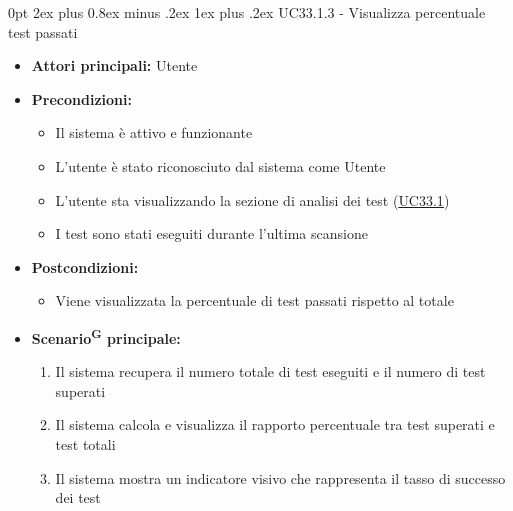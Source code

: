 \documentclass[a4paper, 11pt]{article}
\makeatletter
\renewcommand\subparagraph{\@startsection{subparagraph}{5}
  {0pt}
  {2ex plus 0.8ex minus .2ex}
  {1ex plus .2ex}
  {\normalfont\normalsize\bfseries\color{AccentColor}}}
\makeatother
\begin{document}
\subparagraph{UC33.1.3 - Visualizza percentuale test passati}\label{UC33.1.3}
\begin{itemize}
    \item \textbf{Attori principali:} Utente
    \item \textbf{Precondizioni:}
    \begin{itemize}
        \item Il sistema è attivo e funzionante
        \item L'utente è stato riconosciuto dal sistema come Utente
        \item L'utente sta visualizzando la sezione di analisi dei test (\hyperref[UC33.1]{UC33.1})
        \item I test sono stati eseguiti durante l'ultima scansione
    \end{itemize}
    \item \textbf{Postcondizioni:}
    \begin{itemize}
        \item Viene visualizzata la percentuale di test passati rispetto al totale
    \end{itemize}
    \item \textbf{Scenario\textsuperscript{G} principale:}
    \begin{enumerate}
        \item Il sistema recupera il numero totale di test eseguiti e il numero di test superati
        \item Il sistema calcola e visualizza il rapporto percentuale tra test superati e test totali
        \item Il sistema mostra un indicatore visivo che rappresenta il tasso di successo dei test
    \end{enumerate}
\end{itemize}
\end{document}
